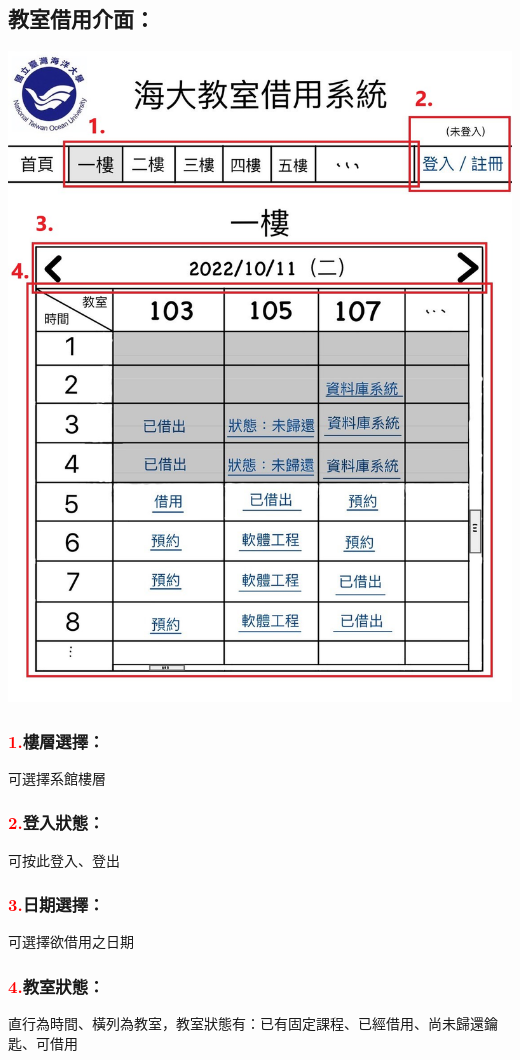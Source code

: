 \documentclass{article}
\begin{document}
\subsection*{教室借用介面：}
\medskip
\begin{minipage}{0.6\linewidth}
	\includegraphics[height=0.4\textheight]{Borowing_GUI.jpg}
\end{minipage}
\begin{minipage}{0.4\linewidth}
	\subsubsection*{\textcolor{red}{1.}樓層選擇：}可選擇系館樓層
	\subsubsection*{\textcolor{red}{2.}登入狀態：}可按此登入、登出
	\subsubsection*{\textcolor{red}{3.}日期選擇：}可選擇欲借用之日期
	\subsubsection*{\textcolor{red}{4.}教室狀態：}直行為時間、橫列為教室，教室狀態有：已有固定課程、已經借用、尚未歸還鑰匙、可借用
\end{minipage}

\end{document}
